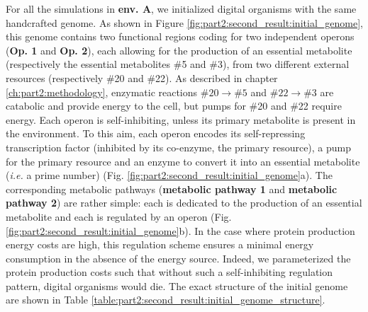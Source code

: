 For all the simulations in \textbf{env. A}, we initialized digital organisms with the same handcrafted genome. As shown in Figure \ref{fig:part2:second_result:initial_genome}, this genome contains two functional regions coding for two independent operons (\textbf{Op. 1} and \textbf{Op. 2}), each allowing for the production of an essential metabolite (respectively the essential metabolites \#5 and \#3), from two different external resources (respectively \#20 and \#22). 
As described in chapter \ref{ch:part2:methodology}, enzymatic reactions $\#20 \rightarrow \#5$ and $\#22 \rightarrow \#3$ are catabolic and provide energy to the cell, but pumps for \#20 and \#22 require energy. Each operon is self-inhibiting, unless its primary metabolite is present in the environment. To this aim, each operon encodes its self-repressing transcription factor (inhibited by its co-enzyme, the primary resource), a pump for the primary resource and an enzyme to convert it into an essential metabolite (\textit{i.e.} a prime number) (Fig. \ref{fig:part2:second_result:initial_genome}a). The corresponding metabolic pathways (\textbf{metabolic pathway 1} and \textbf{metabolic pathway 2}) are rather simple: each is dedicated to the production of an essential metabolite and each is regulated by an operon (Fig. \ref{fig:part2:second_result:initial_genome}b). In the case where protein production energy costs are high, this regulation scheme ensures a minimal energy consumption in the absence of the energy source. Indeed, we parameterized the protein production costs such that without such a self-inhibiting regulation pattern, digital organisms would die. The exact structure of the initial genome are shown in Table \ref{table:part2:second_result:initial_genome_structure}.

